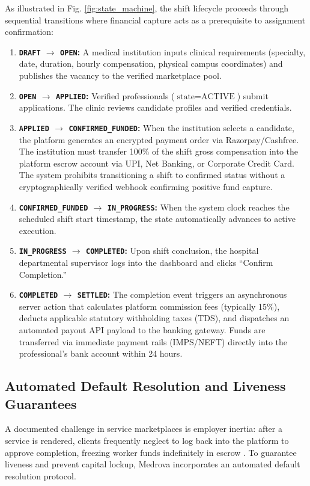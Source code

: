 \documentclass[conference]{IEEEtran}
\begin{document}
As illustrated in Fig. \ref{fig:state_machine}, the shift lifecycle proceeds through sequential transitions where financial capture acts as a prerequisite to assignment confirmation:
\begin{enumerate}
    \item \textbf{\texttt{DRAFT} $\rightarrow$ \texttt{OPEN}:} A medical institution inputs clinical requirements (specialty, date, duration, hourly compensation, physical campus coordinates) and publishes the vacancy to the verified marketplace pool.
    \item \textbf{\texttt{OPEN} $\rightarrow$ \texttt{APPLIED}:} Verified professionals ($\text{state} = \text{ACTIVE}$) submit applications. The clinic reviews candidate profiles and verified credentials.
    \item \textbf{\texttt{APPLIED} $\rightarrow$ \texttt{CONFIRMED\_FUNDED}:} When the institution selects a candidate, the platform generates an encrypted payment order via Razorpay/Cashfree. The institution must transfer 100\% of the shift gross compensation into the platform escrow account via UPI, Net Banking, or Corporate Credit Card. The system prohibits transitioning a shift to confirmed status without a cryptographically verified webhook confirming positive fund capture.
    \item \textbf{\texttt{CONFIRMED\_FUNDED} $\rightarrow$ \texttt{IN\_PROGRESS}:} When the system clock reaches the scheduled shift start timestamp, the state automatically advances to active execution.
    \item \textbf{\texttt{IN\_PROGRESS} $\rightarrow$ \texttt{COMPLETED}:} Upon shift conclusion, the hospital departmental supervisor logs into the dashboard and clicks ``Confirm Completion.'' 
    \item \textbf{\texttt{COMPLETED} $\rightarrow$ \texttt{SETTLED}:} The completion event triggers an asynchronous server action that calculates platform commission fees (typically 15\%), deducts applicable statutory withholding taxes (TDS), and dispatches an automated payout API payload to the banking gateway. Funds are transferred via immediate payment rails (IMPS/NEFT) directly into the professional's bank account within 24 hours.
\end{enumerate}

\subsection{Automated Default Resolution and Liveness Guarantees}
A documented challenge in service marketplaces is employer inertia: after a service is rendered, clients frequently neglect to log back into the platform to approve completion, freezing worker funds indefinitely in escrow \cite{einav2016peer}. To guarantee liveness and prevent capital lockup, Medrova incorporates an automated default resolution protocol.
\end{document}
